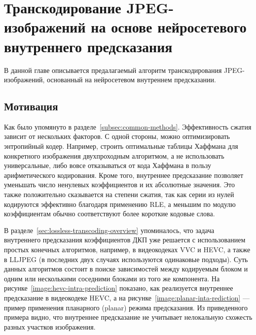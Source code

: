 \documentclass[times,specification,annotation]{itmo-student-thesis}
\begin{document}
\finishrelatedwork

\chapter{Транскодирование JPEG-изображений на основе нейросетевого внутреннего предсказания}\label{chapter:neural-network-transcoder}

В данной главе описывается предалагаемый алгоритм транскодирования JPEG-изображений, основанный на нейросетевом внутреннем предсказании.

\section{Мотивация}\label{section:motivation}

Как было упомянуто в разделе~\ref{subsec:common-methods}. Эффективность сжатия зависит от нескольких факторов. С одной стороны, можно оптимизировать энтропийный кодер. Например, строить оптимальные таблицы Хаффмана для конкретного изображения двухпроходным алгоритмом, а не использовать универсальные, либо вовсе отказываться от кода Хаффмана в пользу арифметического кодирования. Кроме того, внутреннее предсказание позволяет уменьшать число ненулевых коэффициентов и их абсолютные значения. Это также положительно сказывается на степени сжатия, так как серии из нулей кодируются эффективно благодаря применению RLE, а меньшим по модулю коэффициентам обычно соответствуют более короткие кодовые слова.\par

В разделе~\ref{sec:lossless-transcoding-overview} упоминалось, что задача внутреннего предсказания коэффициентов ДКП уже решается с использованием простых конечных алгоритмов, например, в видеокодеках VVC и HEVC, а также в LLJPEG (в последних двух случаях используются одинаковые подходы). Суть данных алгоритмов состоит в поиске зависимостей между кодируемым блоком и одним или несколькими соседними блоками из того же компонента. На рисунке~\ref{image:hevc-intra-prediction} показано, как реализуется внутреннее предсказание в видеокодеке HEVC, а на рисунке~\ref{image:planar-inta-rediction} --- пример применения планарного (planar) режима предсказания. Из приведенного примера видно, что внутреннее предсказание не учитывает нелокальную схожесть разных участков изображения.\par
\end{document}
